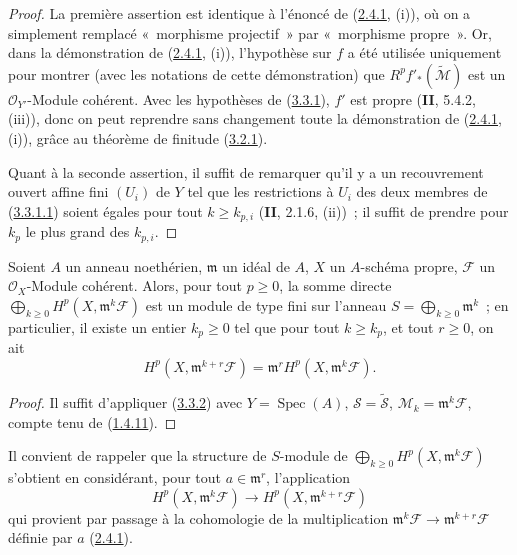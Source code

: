 \begin{proof}
La première assertion est identique à l'énoncé de
(\hyperref[III.2.4.1-fr]{2.4.1}, (i)), où on a simplement remplacé
«~morphisme projectif~» par «~morphisme propre~». Or, dans la démonstration
de (\hyperref[III.2.4.1-fr]{2.4.1}, (i)), l'hypothèse sur $f$ a été utilisée
uniquement pour montrer (avec les notations de cette démonstration) que
$R^pf'_*(\widetilde{\mathcal M})$ est un $\mathcal O_{Y'}$-Module cohérent.
Avec les hypothèses de (\hyperref[III.3.3.1-fr]{3.3.1}), $f'$ est propre
(\textbf{II}, 5.4.2, (iii)), donc on peut reprendre sans changement toute la
démonstration de (\hyperref[III.2.4.1-fr]{2.4.1}, (i)), grâce au théorème de
finitude (\hyperref[III.3.2.1-fr]{3.2.1}).

Quant à la seconde assertion, il suffit de remarquer qu'il y a un
recouvrement ouvert affine fini $(U_i)$ de $Y$ tel que les restrictions à
$U_i$ des deux membres de
(\hyperref[III.3.3.1.1-fr]{3.3.1.1}) soient égales pour tout
$k\geq k_{p,i}$ (\textbf{II}, 2.1.6, (ii))~; il suffit de prendre pour $k_p$ le plus
grand des $k_{p,i}$.
\end{proof}

\begin{corollary}[3.3.2]
\label{III.3.3.2-fr}
Soient $A$ un anneau noethérien, $\mathfrak m$ un idéal de $A$, $X$ un
$A$-schéma propre, $\mathcal F$ un $\mathcal O_X$-Module cohérent. Alors,
pour tout $p\geq0$, la somme directe
$\bigoplus_{k\geq0}H^p(X,\mathfrak m^k\mathcal F)$ est un module de type fini
sur l'anneau $S=\bigoplus_{k\geq0}\mathfrak m^k$~; en particulier, il existe
un entier $k_p\geq0$ tel que pour tout $k\geq k_p$, et tout $r\geq0$, on ait
\[
H^p(X,\mathfrak m^{k+r}\mathcal F)
=\mathfrak m^rH^p(X,\mathfrak m^k\mathcal F).
\tag{3.3.3.1}\label{III.3.3.2.1-fr}
\]
\end{corollary}

\begin{proof}
Il suffit d'appliquer (\hyperref[III.3.3.2-fr]{3.3.2}) avec
$Y=\operatorname{Spec}(A)$, $\mathcal S=\widetilde{\mathcal S}$,
$\mathcal M_k=\mathfrak m^k\mathcal F$, compte tenu de
(\hyperref[III.1.4.11-fr]{1.4.11}).
\end{proof}

Il convient de rappeler que la structure de $S$-module de
$\bigoplus_{k\geq0}H^p(X,\mathfrak m^k\mathcal F)$ s'obtient en considérant,
pour tout $a\in\mathfrak m^r$, l'application
\[
H^p(X,\mathfrak m^k\mathcal F)
\longrightarrow H^p(X,\mathfrak m^{k+r}\mathcal F)
\]
qui provient par passage à la cohomologie de la multiplication
$\mathfrak m^k\mathcal F\to\mathfrak m^{k+r}\mathcal F$ définie par $a$
(\hyperref[III.2.4.1-fr]{2.4.1}).

